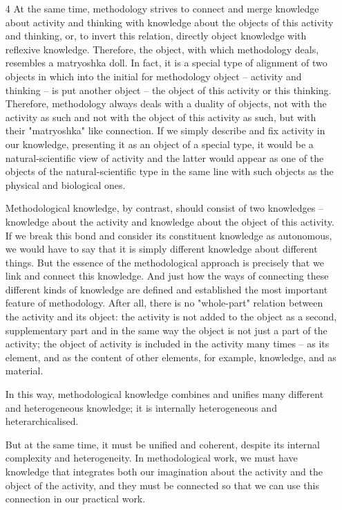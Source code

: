 \documentclass[11pt,a4paper]{article}
\begin{document}
\begin{itemize}
\item[4] At the same time, methodology strives to connect and merge knowledge
  about activity and thinking with knowledge about the objects of this
  activity and thinking, or, to invert this relation, directly object
  knowledge with reflexive knowledge. Therefore, the object, with which
  methodology deals, resembles a matryoshka doll. In fact, it is a special
  type of alignment of two objects in which into the initial for methodology
  object – activity and thinking – is put another object – the object of this
  activity or this thinking. Therefore, methodology always deals with a
  duality of objects, not with the activity as such and not with the object of
  this activity as such, but with their "matryoshka" like connection. If we
  simply describe and fix activity in our knowledge, presenting it as an
  object of a special type, it would be a natural-scientific view of activity
  and the latter would appear as one of the objects of the natural-scientific
  type in the same line with such objects as the physical and biological ones.
  
  Methodological knowledge, by contrast, should consist of two knowledges –
  knowledge about the activity and knowledge about the object of this
  activity. If we break this bond and consider its constituent knowledge as
  autonomous, we would have to say that it is simply different knowledge about
  different things. But the essence of the methodological approach is
  precisely that we link and connect this knowledge. And just how the ways of
  connecting these different kinds of knowledge are defined and established
  the most important feature of methodology. After all, there is no
  "whole-part" relation between the activity and its object: the activity is
  not added to the object as a second, supplementary part and in the same way
  the object is not just a part of the activity; the object of activity is
  included in the activity many times – as its element, and as the content of
  other elements, for example, knowledge, and as material.
  
  In this way, methodological knowledge combines and unifies many different
  and heterogeneous knowledge; it is internally heterogeneous and
  heterarchicalised.
  
  But at the same time, it must be unified and coherent, despite its internal
  complexity and heterogeneity. In methodological work, we must have knowledge
  that integrates both our imagination about the activity and the object of
  the activity, and they must be connected so that we can use this connection
  in our practical work.
  

\end{itemize}
\end{document}
